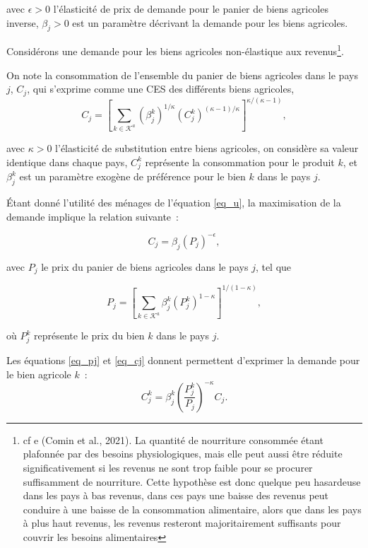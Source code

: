 avec $\epsilon > 0$ l’élasticité de prix de demande pour le panier de biens agricoles inverse, $\beta_j > 0$ est un paramètre décrivant la demande pour les biens agricoles.

Considérons une demande pour les biens agricoles non-élastique aux revenus\footnote{cf e (Comin et al., 2021).  La quantité de nourriture consommée étant plafonnée par des besoins physiologiques, mais elle peut aussi être réduite significativement si les revenus ne sont trop faible pour se procurer suffisamment de nourriture. Cette hypothèse est donc quelque peu hasardeuse dans les pays à bas revenus, dans ces pays une baisse des revenus peut conduire à une baisse de la consommation alimentaire, alors que dans les pays à plus haut revenus, les revenus resteront majoritairement suffisants pour couvrir les besoins alimentaires}.

On note la consommation de l’ensemble du panier de biens agricoles dans le pays $j$, $C_j$, qui s’exprime comme une CES des différents biens agricoles,
\begin{equation}\label{eq_cj}
	C_j = \left[ \sum_{k \in \mathcal{K}^a} (\beta_{j}^k)^{1/\kappa} (C_{j}^k)^{(\kappa-1)/\kappa} \right]^{\kappa/(\kappa-1)},
\end{equation}

avec $\kappa > 0$ l’élasticité de substitution entre biens agricoles, on considère sa valeur identique dans chaque pays, $C_j^k$ représente la consommation pour le produit $k$, et $\beta_{j}^k$ est un paramètre exogène de préférence pour le bien $k$ dans le pays $j$.

Étant donné l’utilité des ménages de l’équation \ref{eq_u}, la maximisation de la demande implique la relation suivante~:

\begin{equation}
	C_j = \beta_j (P_j)^{-\epsilon},
\end{equation}

avec $P_j$ le prix du panier de biens agricoles dans le pays $j$, tel que

\begin{equation}\label{eq_pj}
	P_j = \left[ \sum_{k \in \mathcal{K}^a} \beta_{j}^k (P_{j}^k)^{1-\kappa} \right]^{1/(1-\kappa)},
\end{equation}

où $P_j^k$ représente le prix du bien $k$ dans le pays $j$.

Les équations \ref{eq_pj} et \ref{eq_cj} donnent permettent d’exprimer la demande pour le bien agricole $k$~:
\begin{equation}
	C_j^k = \beta_j^k \left(\frac{P_j^k}{P_j} \right)^{-\kappa} C_j.
\end{equation}

